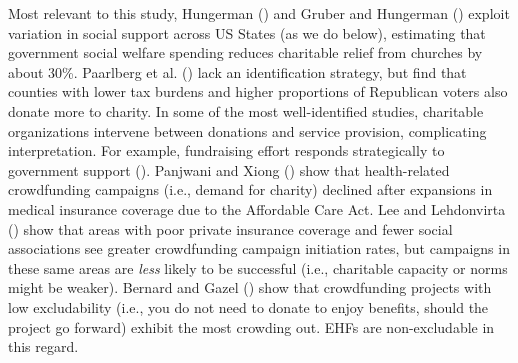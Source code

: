 \documentclass[
  11pt,
  oneside]{article}
\begin{document}
Most relevant to this study, Hungerman () and Gruber and Hungerman () exploit variation in social support across US States (as we do below), estimating that government social welfare spending reduces charitable relief from churches by about 30\%. Paarlberg et al. () lack an identification strategy, but find that counties with lower tax burdens and higher proportions of Republican voters also donate more to charity. In some of the most well-identified studies, charitable organizations intervene between donations and service provision, complicating interpretation. For example, fundraising effort responds strategically to government support (). Panjwani and Xiong () show that health-related crowdfunding campaigns (i.e., demand for charity) declined after expansions in medical insurance coverage due to the Affordable Care Act. Lee and Lehdonvirta () show that areas with poor private insurance coverage and fewer social associations see greater crowdfunding campaign initiation rates, but campaigns in these same areas are \emph{less} likely to be successful (i.e., charitable capacity or norms might be weaker). Bernard and Gazel () show that crowdfunding projects with low excludability (i.e., you do not need to donate to enjoy benefits, should the project go forward) exhibit the most crowding out. EHFs are non-excludable in this regard.
\end{document}
